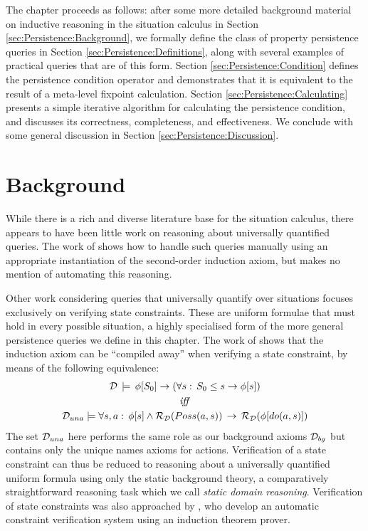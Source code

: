 The chapter proceeds as follows: after some more detailed background
material on inductive reasoning in the situation calculus in Section
\ref{sec:Persistence:Background}, we formally define the class of
property persistence queries in Section \ref{sec:Persistence:Definitions},
along with several examples of practical queries that are of this
form. Section \ref{sec:Persistence:Condition} defines the persistence
condition operator and demonstrates that it is equivalent to the result
of a meta-level fixpoint calculation. Section \ref{sec:Persistence:Calculating}
presents a simple iterative algorithm for calculating the persistence
condition, and discusses its correctness, completeness, and effectiveness.
We conclude with some general discussion in Section \ref{sec:Persistence:Discussion}.


\section{Background\label{sec:Persistence:Background}}

While there is a rich and diverse literature base for the situation
calculus, there appears to have been little work on reasoning about
universally quantified queries. The work of \citet{Reiter93proving}
shows how to handle such queries manually using an appropriate instantiation
of the second-order induction axiom, but makes no mention of automating
this reasoning.

Other work considering queries that universally quantify over situations
focuses exclusively on verifying state constraints. These are uniform
formulae that must hold in every possible situation, a highly specialised
form of the more general persistence queries we define in this chapter.
The work of \citet{Lin94-StateConstraints} shows that the induction
axiom can be {}``compiled away'' when verifying a state constraint,
by means of the following equivalence:\begin{gather*}
\mathcal{D}\,\models\,\phi[S_{0}]\rightarrow\left(\forall s:\, S_{0}\leq s\rightarrow\phi[s]\right)\\
\mathit{iff}\\
\mathcal{D}_{una}\models\forall s,a:\,\phi[s]\wedge\mathcal{R}_{\mathcal{D}}(Poss(a,s))\,\rightarrow\,\mathcal{R}_{\mathcal{D}}(\phi[do(a,s)])\end{gather*}
 The set $\mathcal{D}_{una}$ here performs the same role as our background
axioms $\mathcal{D}_{bg}$ but contains only the unique names axioms for actions.
Verification of a state constraint can thus be reduced to reasoning
about a universally quantified uniform formula using only the static
background theory, a comparatively straightforward reasoning task
which we call \emph{static domain reasoning}. Verification of state
constraints was also approached by \citet{bertossi96automating},
who develop an automatic constraint verification system using an induction
theorem prover.

